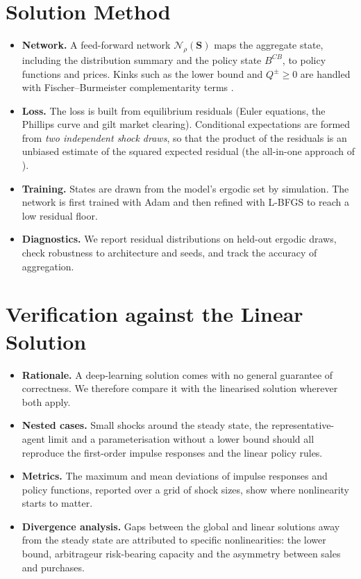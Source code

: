 \documentclass[11pt,a4paper]{article}
\begin{document}
\section{Solution Method}
\begin{itemize}
  \item \textbf{Network.} A feed-forward network $\mathcal{N}_\rho(\mathbf{S})$ maps the aggregate state, including the distribution summary and the policy state $B^{CB}$, to policy functions and prices. Kinks such as the lower bound and $Q^{\pm}\ge0$ are handled with Fischer--Burmeister complementarity terms \citep{MaliarMaliarWinant2021, AzinovicGaegaufScheidegger2022}.
  \item \textbf{Loss.} The loss is built from equilibrium residuals (Euler equations, the Phillips curve and gilt market clearing). Conditional expectations are formed from \emph{two independent shock draws}, so that the product of the residuals is an unbiased estimate of the squared expected residual (the all-in-one approach of \citealp{MaliarMaliarWinant2021}).
  \item \textbf{Training.} States are drawn from the model's ergodic set by simulation. The network is first trained with Adam and then refined with L-BFGS to reach a low residual floor.
  \item \textbf{Diagnostics.} We report residual distributions on held-out ergodic draws, check robustness to architecture and seeds, and track the accuracy of aggregation.
\end{itemize}

\section{Verification against the Linear Solution}
\begin{itemize}
  \item \textbf{Rationale.} A deep-learning solution comes with no general guarantee of correctness. We therefore compare it with the linearised solution wherever both apply.
  \item \textbf{Nested cases.} Small shocks around the steady state, the representative-agent limit and a parameterisation without a lower bound should all reproduce the first-order impulse responses and the linear policy rules.
  \item \textbf{Metrics.} The maximum and mean deviations of impulse responses and policy functions, reported over a grid of shock sizes, show where nonlinearity starts to matter.
  \item \textbf{Divergence analysis.} Gaps between the global and linear solutions away from the steady state are attributed to specific nonlinearities: the lower bound, arbitrageur risk-bearing capacity and the asymmetry between sales and purchases.
\end{itemize}
\end{document}

